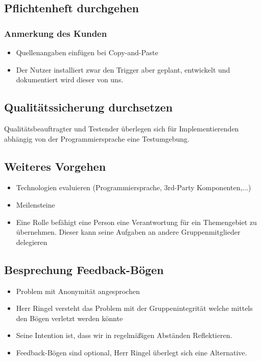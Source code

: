 \documentclass{scrartcl}
\begin{document}
\subsection{Pflichtenheft durchgehen}
\subsubsection*{Anmerkung des Kunden}
\begin{itemize}
    \item Quellenangaben einfügen bei Copy-and-Paste
    \item Der Nutzer installiert zwar den Trigger aber geplant, entwickelt und dokumentiert wird dieser von uns.
\end{itemize}
\subsection{Qualitätssicherung durchsetzen}
Qualitätsbeauftragter und Testender überlegen sich für Implementierenden abhängig von der Programmiersprache eine Testumgebung.
\subsection{Weiteres Vorgehen}
\begin{itemize}
    \item Technologien evaluieren (Programmiersprache, 3rd-Party Komponenten,...)
    \item Meilensteine
    \item Eine Rolle befähigt eine Person eine Verantwortung für ein Themengebiet zu übernehmen. Dieser kann seine Aufgaben an andere Gruppenmitglieder delegieren
\end{itemize}
\subsection{Besprechung Feedback-Bögen}
\begin{itemize}
    \item Problem mit Anonymität angesprochen
    \item Herr Ringel versteht das Problem mit der Gruppenintegrität welche mittels den Bögen verletzt werden könnte
    \item Seine Intention ist, dass wir in regelmäßigen Abständen Reflektieren.
    \item Feedback-Bögen sind optional, Herr Ringel überlegt sich eine Alternative.
\end{itemize}
\end{document}
